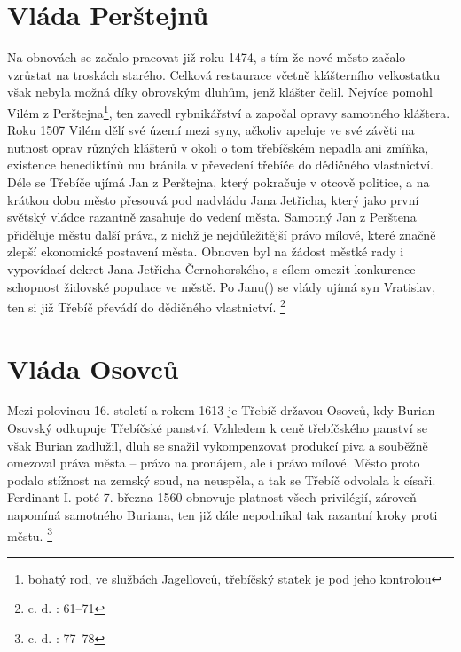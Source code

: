 \documentclass[a4paper,oneside,12p]{report}
\begin{document}
\section{Vláda Perštejnů}

Na obnovách se začalo pracovat již roku 1474, s tím že nové město začalo vzrůstat na troskách starého.
Celková restaurace včetně klášterního velkostatku však nebyla možná díky obrovským dluhům, jenž klášter čelil.
Nejvíce pomohl Vilém z Perštejna\footnote{bohatý rod, ve službách Jagellovců, třebíčský statek je pod jeho kontrolou}, ten zavedl rybnikářství a započal opravy samotného kláštera.
Roku 1507 Vilém dělí své území mezi syny, ačkoliv apeluje ve své závěti na nutnost oprav různých klášterů v okoli o tom třebíčském nepadla ani zmíňka, existence benediktínů mu bránila v převedení třebíče do dědičného vlastnictví.
Déle se Třebíče ujímá Jan z Perštejna, který pokračuje v otcově politice, a na krátkou dobu město přesouvá pod nadvládu Jana Jetřicha, který jako první světský vládce razantně zasahuje do vedení města.
Samotný Jan z Perštena přiděluje městu další práva, z nichž je nejdůležitější právo mílové, které značně zlepší ekonomické postavení města.
Obnoven byl na žádost městké rady i vypovídací dekret Jana Jetřicha Černohorského, s cílem omezit konkurence schopnost židovské populace ve městě.
Po Janu() se vlády ujímá syn Vratislav, ten si již Třebíč převádí do dědičného vlastnictví. \footnote{c. d. : 61--71}

\section{Vláda Osovců}
Mezi polovinou 16. století a rokem 1613 je Třebíč državou Osovců, kdy Burian Osovský odkupuje Třebíčské panství.
Vzhledem k ceně třebíčského panství se však Burian zadlužil, dluh se snažil vykompenzovat produkcí piva a souběžně omezoval práva města -- právo na pronájem, ale i právo mílové.
Město proto podalo stížnost na zemský soud, na neuspěla, a tak se Třebíč odvolala k císaři.
Ferdinant I. poté 7. března 1560 obnovuje platnost všech privilégií, zároveň napomíná samotného Buriana, ten již dále nepodnikal tak razantní kroky proti městu. \footnote{c. d. : 77--78}
\end{document}
